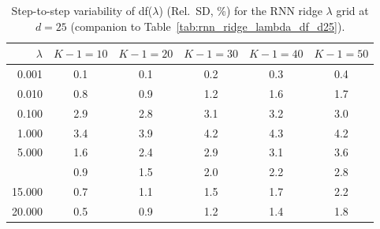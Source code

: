 \begin{table}

\caption{\label{tab:rnn_df_variability_d25}Step-to-step variability of df($\lambda$) (Rel.\ SD, \%) for the RNN ridge $\lambda$ grid at $d=25$ (companion to Table~\ref{tab:rnn_ridge_lambda_df_d25}).}
\footnotesize
\setlength{\tabcolsep}{4pt}
\centering
\begin{tabular}[t]{rccccc}
\toprule
$\lambda$ & $K-1=10$ & $K-1=20$ & $K-1=30$ & $K-1=40$ & $K-1=50$\\
\midrule
0.001 & 0.1 & 0.1 & 0.2 & 0.3 & 0.4\\
0.010 & 0.8 & 0.9 & 1.2 & 1.6 & 1.7\\
0.100 & 2.9 & 2.8 & 3.1 & 3.2 & 3.0\\
1.000 & 3.4 & 3.9 & 4.2 & 4.3 & 4.2\\
5.000 & 1.6 & 2.4 & 2.9 & 3.1 & 3.6\\
\addlinespace
10.000 & 0.9 & 1.5 & 2.0 & 2.2 & 2.8\\
15.000 & 0.7 & 1.1 & 1.5 & 1.7 & 2.2\\
20.000 & 0.5 & 0.9 & 1.2 & 1.4 & 1.8\\
\bottomrule
\end{tabular}
\end{table}
